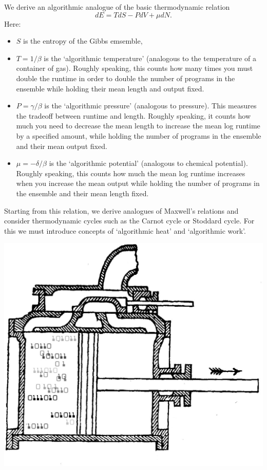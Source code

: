 \documentclass[12pt,twoside,openright]{report}
\begin{document}
We derive an algorithmic analogue of the basic thermodynamic relation
\[          dE = T dS - P dV + \mu dN . \]
Here:
\begin{itemize}
\item 
$S$ is the entropy of the Gibbs emsemble,
\item
$T = 1/\beta$ is the `algorithmic temperature' (analogous to the temperature of a container of gas).  Roughly speaking, this counts how many times you must double the runtime in order to double the number of programs in the ensemble while holding their mean length and output fixed.
\item
$P = \gamma/\beta$ is the `algorithmic pressure' (analogous to pressure).  This measures the tradeoff between runtime and length. Roughly speaking, it counts how much you need to decrease the mean length to increase the mean log runtime by a specified amount, while holding the number of programs in the ensemble and their mean output fixed.
\item
$\mu = -\delta/\beta$ is the `algorithmic potential' (analogous to chemical potential).  Roughly speaking, this counts how much the mean log runtime increases when you increase the mean output while holding the number of programs in the ensemble and their mean length fixed.
\end{itemize}

Starting from this relation, we derive analogues of Maxwell's relations and consider thermodynamic cycles such as the Carnot cycle or Stoddard cycle.  For this we must introduce concepts of `algorithmic heat' and `algorithmic work'.

\begin{center}
\includegraphics[scale=0.15, angle=0.3]{piston.eps}
\end{center}
\end{document}
